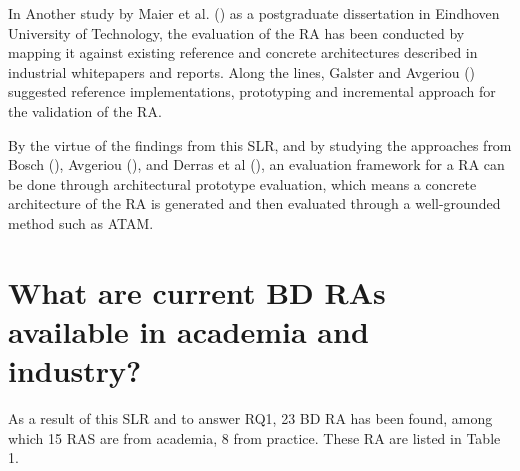 \documentclass[review]{elsarticle}
\begin{document}
In Another study by Maier et al. (\cite{Maier}) as a postgraduate dissertation in Eindhoven University of Technology, the evaluation of the RA has been conducted by mapping it against existing reference and concrete architectures described in industrial whitepapers and reports. Along the lines, Galster and Avgeriou (\cite{galster2011empirically}) suggested reference implementations, prototyping and incremental approach for the validation of the RA.

By the virtue of the findings from this SLR, and by studying the approaches from Bosch (\cite{bosch2000design}), Avgeriou (\cite{avgeriou2003describing}), and Derras et al (\cite{derras2018reference}), an evaluation framework for a RA can be done through architectural prototype evaluation, which means a concrete architecture of the RA is generated and then evaluated through a well-grounded method such as ATAM.

\section{What are current BD RAs available in academia and industry?}

As a result of this SLR and to answer RQ1, 23 BD RA has been found, among which 15 RAS are from academia, 8 from practice. These RA are listed in Table 1.
\end{document}
